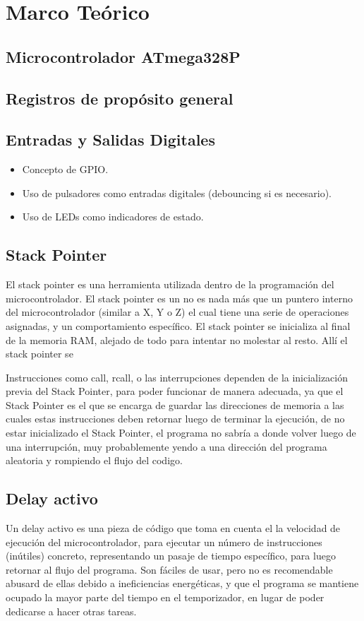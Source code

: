 \section{Marco Teórico}

\subsection{Microcontrolador ATmega328P}



\subsection{Registros de propósito general}

\subsection{Entradas y Salidas Digitales}
\begin{itemize}
    \item Concepto de GPIO.
    \item Uso de pulsadores como entradas digitales (debouncing si es necesario).
    \item Uso de LEDs como indicadores de estado.
\end{itemize}


\subsection{Stack Pointer}
El stack pointer es una herramienta utilizada dentro de la programación del microcontrolador. El stack pointer es un no es nada más que un puntero interno del microcontrolador (similar a X, Y o Z) el cual tiene una serie de operaciones asignadas, y un comportamiento específico. El stack pointer se inicializa al final de la memoria RAM, alejado de todo para intentar no molestar al resto. Allí el stack pointer se %

Instrucciones como call, rcall, o las interrupciones dependen de la inicialización previa del Stack Pointer, para poder funcionar de manera adecuada, ya que el Stack Pointer es el que se encarga de guardar las direcciones de memoria a las cuales estas instrucciones deben retornar luego de terminar la ejecución, de no estar inicializado el Stack Pointer, el programa no sabría a donde volver luego de una interrupción, muy probablemente yendo a una dirección del programa aleatoria y rompiendo el flujo del codigo.

\subsection{Delay activo}
Un delay activo es una pieza de código que toma en cuenta el la velocidad de ejecución del microcontrolador, para ejecutar un número de instrucciones (inútiles) concreto, representando un pasaje de tiempo específico, para luego retornar al flujo del programa. Son fáciles de usar, pero no es recomendable abusard de ellas debido a ineficiencias energéticas, y que el programa se mantiene ocupado la mayor parte del tiempo en el temporizador, en lugar de poder dedicarse a hacer otras tareas.

